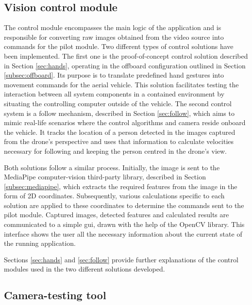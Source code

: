 \subsection{Vision control module}
\label{subsec:control-module}

The control module encompasses the main logic of the application and is responsible for converting raw images obtained from the video source into commands for the pilot module. Two different types of control solutions have been implemented. The first one is the proof-of-concept control solution described in Section \ref{sec:hands}, operating in the offboard configuration outlined in Section \ref{subsec:offboard}. Its purpose is to translate predefined hand gestures into movement commands for the aerial vehicle. This solution facilitates testing the interaction between all system components in a contained environment by situating the controlling computer outside of the vehicle. The second control system is a follow mechanism, described in Section \ref{sec:follow}, which aims to mimic real-life scenarios where the control algorithms and camera reside onboard the vehicle. It tracks the location of a person detected in the images captured from the drone's perspective and uses that information to calculate velocities necessary for following and keeping the person centred in the drone's view.

Both solutions follow a similar process. Initially, the image is sent to the MediaPipe computer-vision third-party library, described in Section \ref{subsec:mediapipe}, which extracts the required features from the image in the form of 2D coordinates. Subsequently, various calculations specific to each solution are applied to these coordinates to determine the commands sent to the pilot module.
Captured images, detected features and calculated results are communicated to a simple \acrshort{gui}, drawn with the help of the OpenCV library. This interface shows the user all the necessary information about the current state of the running application.

Sections \ref{sec:hands} and \ref{sec:follow} provide further explanations of the control modules used in the two different solutions developed.

\subsection{Camera-testing tool}
\label{subsec:cam-tool}

